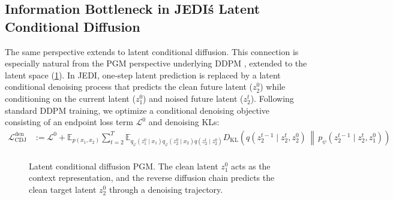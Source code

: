 \documentclass{article}
\newcommand{\E}{\mathbb{E}}
\newcommand{\KL}{D_{\mathrm{KL}}}
\begin{document}
\subsection{Information Bottleneck in JEDI\'s Latent Conditional Diffusion}
The same perspective extends to latent conditional diffusion. This connection is especially natural from the PGM perspective underlying DDPM \citep{ho2020ddpm}, extended to the latent space (\cref{fig:joint-embedding-diffusion-pgm}). In JEDI, one-step latent prediction is replaced by a latent conditional denoising process that predicts the clean future latent ($z_2^0$) while conditioning on the current latent ($z_1^0$) and noised future latent ($z_2^t$). Following standard DDPM training, we optimize a conditional denoising objective consisting of an endpoint loss term $\mathcal L^0$ and denoising KLs:
\begin{equation}
\begin{aligned}
\mathcal L_{\mathrm{CDJ}}^{\mathrm{den}}
&:=
\mathcal L^0
+
\E_{p(x_1,x_2)}
\sum_{t=2}^{T}
\E_{q_\varphi(z_1^0\mid x_1)q_\varphi(z_2^0\mid x_2)q(z_2^t\mid z_2^0)}
\KL\left(
q(z_2^{t-1}\mid z_2^t,z_2^0)
\,\middle\|\,
p_\psi(z_2^{t-1}\mid z_2^t,z_1^0)
\right)
\\
\end{aligned}
\label{eq:main_cdj_denoising_loss}
\end{equation}
\begin{figure}
    \vspace{-25pt}
    \centering
    \caption{Latent conditional diffusion PGM. The clean latent $z_1^0$ acts as the context representation, and the reverse diffusion chain predicts the clean target latent $z_2^0$ through a denoising trajectory.}
    \label{fig:joint-embedding-diffusion-pgm}
\end{figure}
\end{document}
